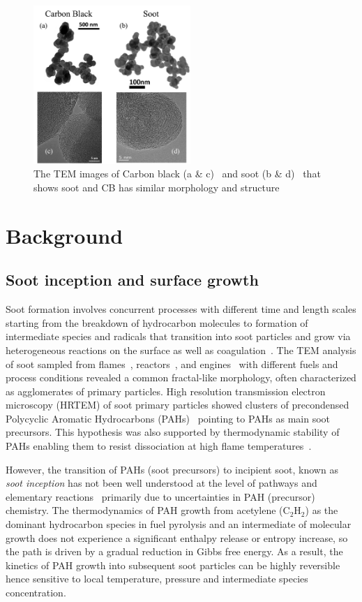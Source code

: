 \begin{figure}[!htbp]
	\centering
	\includegraphics[height=60mm, ]{Figures/Introduction/soot_CB_HRTEM.jpg}
	\caption{The TEM images of Carbon black (a \& c)~\citep{singh2018nanostructure} and soot (b \& d)~\citep{vander2007hrtem, lapuerta2017morphological}
	\label{fig:sootCBHRTEM} that shows soot and CB has similar morphology and structure}
\end{figure} 



\section{Background}
\subsection{Soot inception and surface growth}
Soot formation involves concurrent processes with different time and length scales starting from the breakdown of hydrocarbon molecules to formation of intermediate species and radicals that transition into soot particles and grow via heterogeneous reactions on the surface as well as coagulation~\citep{d2009combustion}. The TEM analysis of soot sampled from flames~\citep{lapuerta2017morphological}, reactors~\citep{ono2017experimental}, and engines~\citep{wei2020morphology} with different fuels and process conditions revealed a common fractal-like morphology, often characterized as agglomerates of primary particles. High resolution transmission electron microscopy (HRTEM) of soot primary particles showed clusters of precondensed Polycyclic Aromatic Hydrocarbons (PAHs)~\cite{alfe2009structure} pointing to PAHs as main soot precursors. This hypothesis was also supported by thermodynamic stability of PAHs enabling them to resist dissociation at high flame temperatures~\cite{stein1985high}. 

However, the transition of PAHs (soot precursors) to incipient soot, known as \textit{soot inception} has not been well understood at the level of pathways and elementary reactions~\cite{Wang2011} primarily due to uncertainties in PAH (precursor) chemistry. The thermodynamics of PAH growth from acetylene ($\mathrm{C_2H_2}$) as the dominant hydrocarbon species in fuel pyrolysis and an
intermediate of molecular growth does not experience a significant enthalpy release or entropy increase, so the path is driven by a gradual reduction in Gibbs free energy. As a result, the kinetics of PAH growth into 
subsequent soot particles can be highly reversible hence sensitive to local temperature, pressure and intermediate species concentration.

